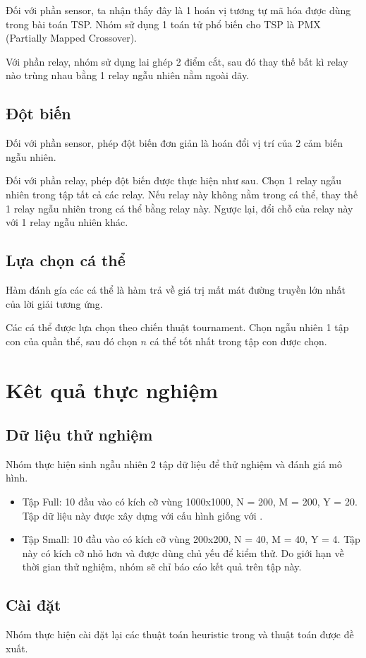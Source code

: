 \documentclass[hidelinks, 11pt, a4paper]{report}
\begin{document}
Đối với phần sensor, ta nhận thấy đây là 1 hoán vị tương tự mã hóa được dùng trong bài toán TSP. Nhóm sử dụng 1 toán tử phổ biến cho TSP là PMX (Partially Mapped Crossover).

Với phần relay, nhóm sử dụng lai ghép 2 điểm cắt, sau đó thay thế bất kì relay nào trùng nhau bằng 1 relay ngẫu nhiên nằm ngoài dãy.

\section{Đột biến}
Đối với phần sensor, phép đột biến đơn giản là hoán đổi vị trí của 2 cảm biến ngẫu nhiên.

Đối với phần relay, phép đột biến được thực hiện như sau. Chọn 1 relay ngẫu nhiên trong tập tất cả các relay. Nếu relay này không nằm trong cá thể, thay thế 1 relay ngẫu nhiên trong cá thể bằng relay này. Ngược lại, đổi chỗ của relay này với 1 relay ngẫu nhiên khác.

\section{Lựa chọn cá thể}
Hàm đánh gía các cá thể là hàm trả về giá trị mất mát đường truyền lớn nhất của lời giải tương ứng.

Các cá thể được lựa chọn theo chiến thuật tournament. Chọn ngẫu nhiên 1 tập con của quần thể, sau đó chọn $n$ cá thể tốt nhất trong tập con được chọn.

\chapter{Kêt quả thực nghiệm}
\section{Dữ liệu thử nghiệm}
Nhóm thực hiện sinh ngẫu nhiên 2 tập dữ liệu để thử nghiệm và đánh giá mô hình.
\begin{itemize}
    \item Tập Full: 10 đầu vào có kích cỡ vùng 1000x1000, N = 200, M = 200, Y = 20. Tập dữ liệu này được xây dựng với cấu hình giống với \cite{YuanWusn}.
    \item Tập Small: 10 đầu vào có kích cỡ vùng 200x200, N = 40, M = 40, Y = 4. Tập này có kích cỡ nhỏ hơn và được dùng chủ yếu để kiểm thử. Do giới hạn về thời gian thử nghiệm, nhóm sẽ chỉ báo cáo kết quả trên tập này.
\end{itemize}

\section{Cài đặt}
Nhóm thực hiện cài đặt lại các thuật toán heuristic trong \cite{YuanWusn} và thuật toán được đề xuất.
\end{document}
